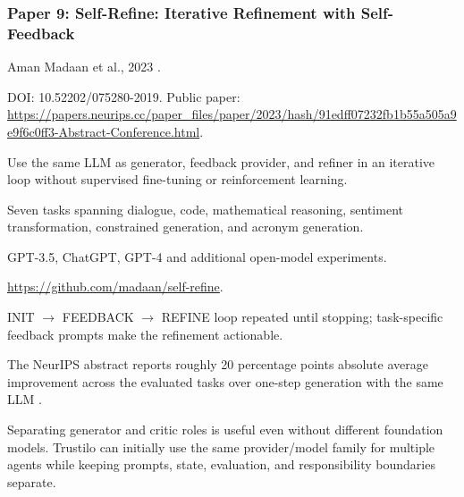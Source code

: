 \documentclass[11pt,journal,onecolumn]{IEEEtran}
\begin{document}
\subsubsection{Paper 9: Self-Refine: Iterative Refinement with Self-Feedback}
\begin{description}[leftmargin=3.25cm,style=nextline]
\item[Authors / Year] Aman Madaan et al., 2023 \cite{madaan2023selfrefine}.
\item[DOI / Link] DOI: 10.52202/075280-2019. Public paper: \url{https://papers.neurips.cc/paper_files/paper/2023/hash/91edff07232fb1b55a505a9e9f6c0ff3-Abstract-Conference.html}.
\item[Main idea] Use the same LLM as generator, feedback provider, and refiner in an iterative loop without supervised fine-tuning or reinforcement learning.
\item[Datasets] Seven tasks spanning dialogue, code, mathematical reasoning, sentiment transformation, constrained generation, and acronym generation.
\item[Models] GPT-3.5, ChatGPT, GPT-4 and additional open-model experiments.
\item[Code] \url{https://github.com/madaan/self-refine}.
\item[Procedure / tricks] INIT $\rightarrow$ FEEDBACK $\rightarrow$ REFINE loop repeated until stopping; task-specific feedback prompts make the refinement actionable.
\item[Metrics / results] The NeurIPS abstract reports roughly 20 percentage points absolute average improvement across the evaluated tasks over one-step generation with the same LLM \cite{madaan2023selfrefine}.
\item[Key learning] Separating generator and critic roles is useful even without different foundation models. Trustilo can initially use the same provider/model family for multiple agents while keeping prompts, state, evaluation, and responsibility boundaries separate.
\end{description}

\end{document}
